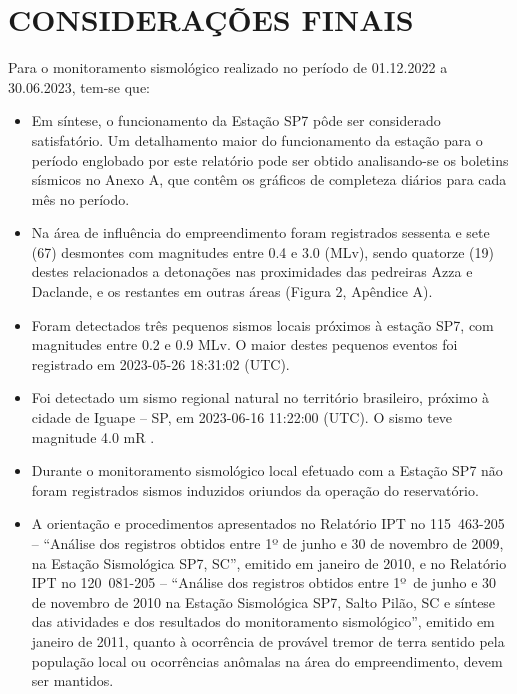 \section{CONSIDERAÇÕES FINAIS}
\label{sec:consid}

\par{Para o monitoramento sismológico realizado no período de 01.12.2022 a 30.06.2023, tem-se que:}

\begin{itemize}
    \item Em síntese, o funcionamento da Estação SP7 pôde ser considerado satisfatório. Um detalhamento maior do funcionamento da estação para o período englobado por este relatório pode ser obtido analisando-se os boletins sísmicos no Anexo A, que contêm os gráficos de completeza diários para cada mês no período.
    \item Na área de influência do empreendimento foram registrados sessenta e sete (67) desmontes com magnitudes entre 0.4 e 3.0 (MLv), sendo quatorze (19) destes relacionados a detonações nas proximidades das pedreiras Azza e Daclande, e os restantes em outras áreas (Figura 2, Apêndice A).
    \item Foram detectados três pequenos sismos locais próximos à estação SP7, com magnitudes entre 0.2 e 0.9 MLv. O maior destes pequenos eventos foi registrado em 2023-05-26 18:31:02 (UTC).
    \item Foi detectado um sismo regional natural no território brasileiro, próximo à cidade de Iguape – SP, em 2023-06-16 11:22:00 (UTC). O sismo teve magnitude 4.0 mR .
    \item Durante o monitoramento sismológico local efetuado com a Estação SP7 não foram registrados sismos induzidos oriundos da operação do reservatório. 
    \item A orientação e procedimentos apresentados no Relatório IPT no 115 463-205 – “Análise dos registros obtidos entre 1º de junho e 30 de novembro de 2009, na Estação Sismológica SP7, SC”, emitido em janeiro de 2010, e no Relatório IPT no 120 081-205 – “Análise dos registros obtidos entre 1º de junho e 30 de novembro de 2010 na Estação Sismológica SP7, Salto Pilão, SC e síntese das atividades e dos resultados do monitoramento sismológico”, emitido em janeiro de 2011, quanto à ocorrência de provável tremor de terra sentido pela população local ou ocorrências anômalas na área do empreendimento, devem ser mantidos.
\end{itemize}


